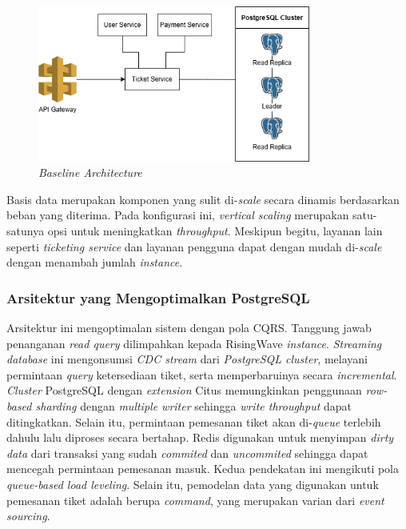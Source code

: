 \begin{figure}[ht]
  \centering
  \includegraphics[width=0.8\textwidth]{resources/chapter-3/architecture-reference.png}
  \caption{\textit{Baseline Architecture}}
  \label{fig:baseline-architecture}
\end{figure}

Basis data merupakan komponen yang sulit di-\textit{scale} secara dinamis berdasarkan beban yang diterima. Pada konfigurasi ini, \textit{vertical scaling} merupakan satu-satunya opsi untuk meningkatkan \textit{throughput}. Meskipun begitu, layanan lain seperti \textit{ticketing service} dan layanan pengguna dapat dengan mudah di-\textit{scale} dengan menambah jumlah \textit{instance}.

\subsubsection{Arsitektur yang Mengoptimalkan PostgreSQL}

Arsitektur ini mengoptimalan sistem dengan pola CQRS. Tanggung jawab penanganan \textit{read query} dilimpahkan kepada RisingWave \textit{instance}. \textit{Streaming database} ini mengonsumsi \textit{CDC stream} dari \textit{PostgreSQL cluster}, melayani permintaan \textit{query} ketersediaan tiket, serta memperbaruinya secara \textit{incremental}. \textit{Cluster} PostgreSQL dengan \textit{extension} Citus memungkinkan penggunaan \textit{row-based sharding} dengan \textit{multiple writer} sehingga \textit{write throughput} dapat ditingkatkan. Selain itu, permintaan pemesanan tiket akan di-\textit{queue} terlebih dahulu lalu diproses secara bertahap. Redis digunakan untuk menyimpan \textit{dirty data} dari transaksi yang sudah \textit{commited} dan \textit{uncommited} sehingga dapat mencegah permintaan pemesanan masuk. Kedua pendekatan ini mengikuti pola \textit{queue-based load leveling}. Selain itu, pemodelan data yang digunakan untuk pemesanan tiket adalah berupa \textit{command}, yang merupakan varian dari \textit{event sourcing}.

